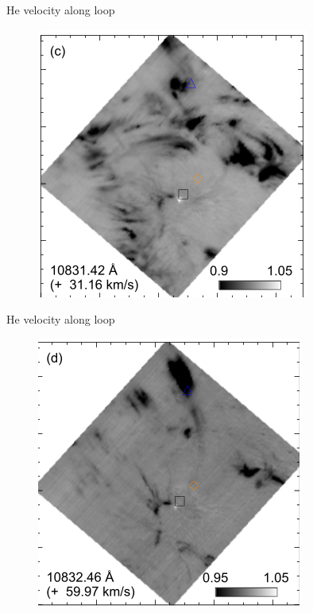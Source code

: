 \documentclass{beamer}
\begin{document}
\begin{frame}{He velocity along loop}
 
\begin{figure}[H]
 \centering
 \includegraphics[scale=0.6]{spc.png}
\end{figure}

\end{frame}



\begin{frame}{He velocity along loop}
 
\begin{figure}[H]
 \centering
 \includegraphics[scale=0.6]{spd.png}
\end{figure}

\end{frame}
\end{document}
